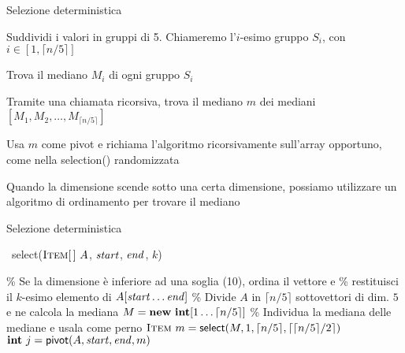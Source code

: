 \begin{frame}{Selezione deterministica}

\vspace{-9pt}
\begin{myboxtitle}[Idea]
\BIL
\item Suddividi i valori in gruppi di 5. Chiameremo l'$i$-esimo gruppo $S_i$, con $i \in \left[1, \lceil n/5 \rceil \right]$
\item Trova il mediano $M_i$ di ogni gruppo $S_i$
\item Tramite una chiamata ricorsiva, trova il mediano $m$ dei mediani
$[M_1, M_2, \ldots, M_{\lceil n/5 \rceil}]$
\item Usa $m$ come pivot e richiama l'algoritmo ricorsivamente sull'array opportuno, come nella \textsf{selection}() randomizzata
\item Quando la dimensione scende sotto una certa dimensione, possiamo
utilizzare un algoritmo di ordinamento per trovare il mediano
\EIL
\end{myboxtitle}

\end{frame}

\begin{frame}{Selezione deterministica}

\vspace{-12pt}
\small
\begin{Procedure}
\caption[A]{\Item\ \textsf{select}($\textsc{Item}[\,]\ A$, \INTEGER $\mathit{start}$, \INTEGER $\mathit{end}$, \INTEGER $k$)}
\% Se la dimensione è inferiore ad una soglia (10), ordina il vettore e\;
\% restituisci il $k$-esimo  elemento di $A[\mathit{start} \ldots \mathit{end}]$\;
\BlankLine
\% Divide $A$ in $\lceil n/5 \rceil$ sottovettori di dim. $5$ e ne calcola la mediana\;
$M = \NEW\ \INTEGER[1 \ldots \lceil n/5 \rceil]$\;
\BlankLine
\% Individua la mediana delle mediane e usala come perno\;
$\textsc{Item}\ m = \textsf{select}(M, 1, \lceil n/5 \rceil, \lceil \lceil n/5 \rceil/2 \rceil)$\;
$\INTEGER\ j = \textsf{pivot}(A, \Primo, \Ultimo, m)$\;
[...]\;
\end{Procedure}

\end{frame}

